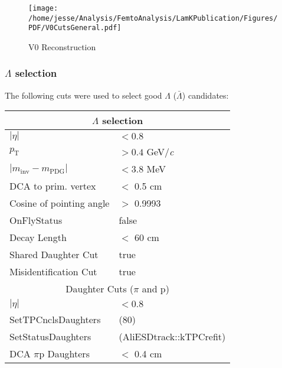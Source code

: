 \documentclass[ALICE,manyauthors]{cernphprep}
\begin{document}
\begin{figure}[h]
  \centering
  \texttt{[image: /home/jesse/Analysis/FemtoAnalysis/LamKPublication/Figures/PDF/V0CutsGeneral.pdf]}
  \caption[V0 Reconstruction]{V0 Reconstruction}
  \label{fig:V0Reconstruction}
\end{figure}


\subsubsection{$\Lambda$ selection}
\label{sec:LambdaSelection}
The following cuts were used to select good $\Lambda$ ($\bar{\Lambda}$) candidates: 


\begin{table}[htbp]
 \centering
  \begin{tabular}{lc|c|l}
   \hline  
   \multicolumn{4}{c}{$\Lambda$ selection} \\
   \hline
   \multicolumn{3}{l|}{$|\eta|$} & $< 0.8$ \\
   \hline
   \multicolumn{3}{l|}{$p_{\mathrm{T}}$} & $> 0.4$ GeV/\textit{c} \\
   \hline
   \multicolumn{3}{l|}{$|m_{\mathrm{inv}} - m_{\mathrm{PDG}}|$} & $< 3.8$ MeV \\ 
   \hline
   \multicolumn{3}{l|}{DCA to prim. vertex} & $<$ 0.5 cm \\
   \hline
   \multicolumn{3}{l|}{Cosine of pointing angle} & $>$ 0.9993 \\
   \hline
   \multicolumn{3}{l|}{OnFlyStatus} & false \\
   \hline
   \multicolumn{3}{l|}{Decay Length} & $<$ 60 cm \\
   \hline
   \multicolumn{3}{l|}{Shared Daughter Cut} & true \\
   \hline
   \multicolumn{3}{l|}{Misidentification Cut} & true \\
   \hline   
   
   
   \multicolumn{4}{c}{Daughter Cuts ($\pi$ and p)} \\
   \hline
   \multicolumn{3}{l|}{$|\eta|$} &  $< 0.8$ \\
   \hline
   \multicolumn{3}{l|}{SetTPCnclsDaughters} & (80) \\
   \hline
   \multicolumn{3}{l|}{SetStatusDaughters} & (AliESDtrack::kTPCrefit) \\
   \hline
   \multicolumn{3}{l|}{DCA $\pi$p Daughters} & $<$ 0.4 cm \\
   \hline
   

\end{tabular}
\end{table}
\end{document}
